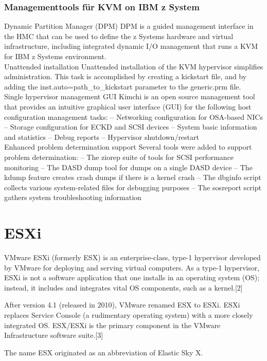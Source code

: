 \documentclass[14pt]{extreport}
\begin{document}
\subsubsection{Managementtools für KVM on IBM z System}
Dynamic Partition Manager (DPM)
DPM is a guided management interface in the HMC that can be used to define the 
z Systems hardware and virtual infrastructure, including integrated dynamic I/O 
management that runs a KVM for IBM z Systems environment.\\ 
Unattended installation
Unattended installation of the KVM hypervisor simplifies administration. This task is 
accomplished by creating a kickstart file, and by adding the 
inst.auto=path\_to\_kickstart
parameter to the 
generic.prm
 file.\\

Single hypervisor management GUI
Kimchi is an open source management tool that provides an intuitive graphical user 
interface (GUI) for the following host configuration management tasks:
–   Networking configuration for OSA-based NICs
–   Storage configuration for ECKD and SCSI devices
–   System basic information and statistics
–   Debug reports
–   Hypervisor shutdown/restart
\\
Enhanced problem determination support
Several tools were added to support problem determination:
–   The ziorep suite of tools for SCSI performance monitoring
–   The DASD dump tool for dumps on a single DASD device
–   The kdump feature creates crash dumps if there is a kernel crash
–   The dbginfo script collects various system-related files for debugging purposes
–   The sosreport script gathers system troubleshooting information

\section{ESXi}
VMware ESXi (formerly ESX) is an enterprise-class, type-1 hypervisor developed by VMware for deploying and serving virtual computers. As a type-1 hypervisor, ESXi is not a software application that one installs in an operating system (OS); instead, it includes and integrates vital OS components, such as a kernel.[2]

After version 4.1 (released in 2010), VMware renamed ESX to ESXi. ESXi replaces Service Console (a rudimentary operating system) with a more closely integrated OS. ESX/ESXi is the primary component in the VMware Infrastructure software suite.[3]

The name ESX originated as an abbreviation of Elastic Sky X.
\end{document}
